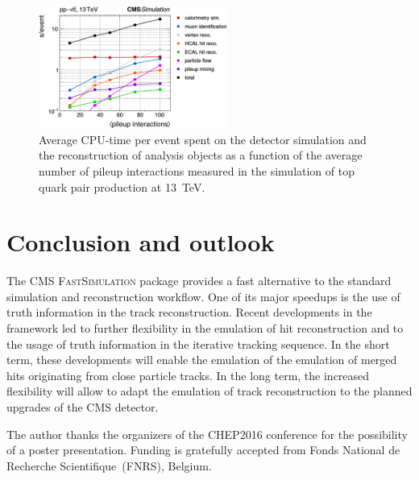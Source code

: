\documentclass[a4paper]{jpconf}
\begin{document}
\clearpage

\begin{figure}[t]
\begin{center}
\includegraphics[width=0.55\textwidth]{figures/cpu_profile.pdf}
\caption{\label{fig:cpu}Average CPU-time per event spent on the detector simulation and the reconstruction of analysis objects as a function of the average number of pileup interactions measured in the simulation of top quark pair production at 13~TeV.}
\end{center}
\end{figure}



\section{Conclusion and outlook}

The CMS \textsc{FastSimulation} package provides a fast alternative to the standard simulation and reconstruction workflow. One of its major speedups is the use of truth information in the track reconstruction. Recent developments in the framework led to further flexibility in the emulation of hit reconstruction and to the usage of truth information in the iterative tracking sequence. In the short term, these developments will enable the emulation of the emulation of merged hits originating from close particle tracks. In the long term, the increased flexibility will allow to adapt the emulation of track reconstruction to the planned upgrades of the CMS detector.


\ack
The author thanks the organizers of the \textsc{CHEP2016} conference for the possibility of a poster presentation. Funding is gratefully accepted from Fonds National de Recherche Scientifique~(FNRS), Belgium.
\end{document}
